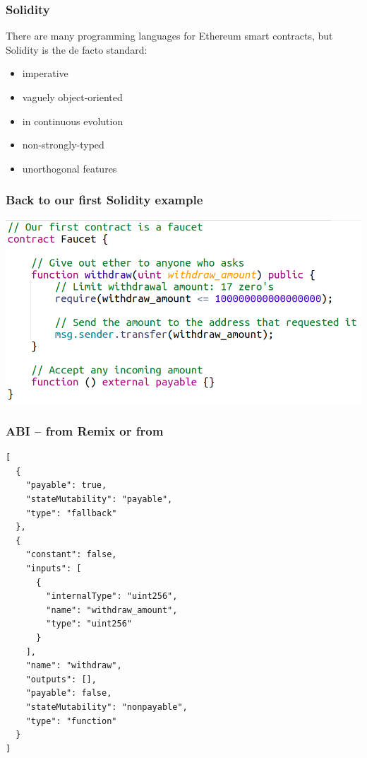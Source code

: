 \documentclass[11pt]{beamer}  %
\def\codesize{\smaller}
\def\<#1>{\codeid{#1}}
\newcommand{\codeid}[1]{\ifmmode{\mbox{\codesize\ttfamily{#1}}}\else{\codesize\ttfamily #1}\fi}
\begin{document}
\begin{frame}\frametitle{Solidity}

  \begin{greenbox}{}
    There are many programming languages for Ethereum smart contracts,
    but Solidity is the de facto standard:
    \begin{itemize}
    \item imperative
    \item vaguely object-oriented
    \item in continuous evolution
    \item \alert{non}-strongly-typed
    \item unorthogonal features
    \end{itemize}
  \end{greenbox}

\end{frame}

\begin{frame}\frametitle{Back to our first Solidity example}
  \begin{center}
    \includegraphics[width=\textwidth,clip=false]{pictures/faucet_sol.png}
  \end{center}
\end{frame}

\begin{frame}[fragile]\frametitle{ABI -- from Remix or from \<solc>}

{\scriptsize\begin{verbatim}
[
  {
    "payable": true,
    "stateMutability": "payable",
    "type": "fallback"
  },
  {
    "constant": false,
    "inputs": [
      {
        "internalType": "uint256",
        "name": "withdraw_amount",
        "type": "uint256"
      }
    ],
    "name": "withdraw",
    "outputs": [],
    "payable": false,
    "stateMutability": "nonpayable",
    "type": "function"
  }
]
\end{verbatim}}
\end{frame}
\end{document}
